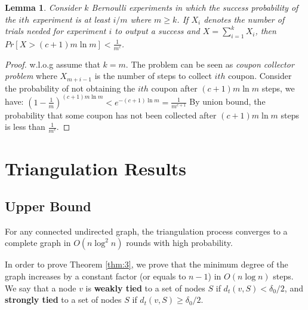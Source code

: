 \documentclass[
10pt, %
a4paper, %
oneside, %
headinclude,footinclude, %
BCOR5mm, %
]{scrartcl}
\newtheorem{lemma}[theorem]{\textbf{Lemma}}
\begin{document}
\begin{lemma}\label{lem:2}
	Consider $k$ Bernoulli experiments in which the success probability of the $ith$ experiment is at least $i/m$ where $m \geq k$. If $X_i$ denotes the number of trials needed for experiment $i$ to output a success and $X = \sum_{i=1}^{k}X_i$, then $Pr[X > (c+1)m\ln m] < \frac{1}{m^c}$.
\end{lemma}
\begin{proof}
	w.l.o.g assume that $k=m$. The problem can be seen as \textit{coupon collector problem} where $X_{m+i-1}$ is the number of steps to collect $ith$ coupon. Consider the probability of not obtaining the $ith$ coupon after $(c+1)m\ln m$ steps, we have:
	\begin{math}
		(1 - \frac{1}{m})^{(c+1) m \ln m} < e^{-(c+1)\ln m} = \frac{1}{m^{c+1}}
	\end{math}
	By union bound, the probability that some coupon has not been collected after $(c+1)m \ln m$ steps is less than $\frac{1}{m^c}$.
\end{proof}


\section{Triangulation Results}
\subsection{Upper Bound}

\begin{theorem}\label{thm:3}
	For any connected undirected graph, the triangulation process converges to a complete graph in $O(n \log^2 n)$ rounds with high probability.
\end{theorem}
In order to prove Theorem \ref{thm:3}, we prove that the minimum degree of the graph increases by a constant factor (or equals to $n-1$) in $O(n\log n)$ steps. We say that a node $v$ is \textbf{weakly tied} to a set of nodes $S$ if $d_t(v, S) < \delta_0 / 2$, and \textbf{strongly tied} to a set of nodes $S$ if $d_t(v, S) \geq \delta_0 / 2$.
\end{document}

